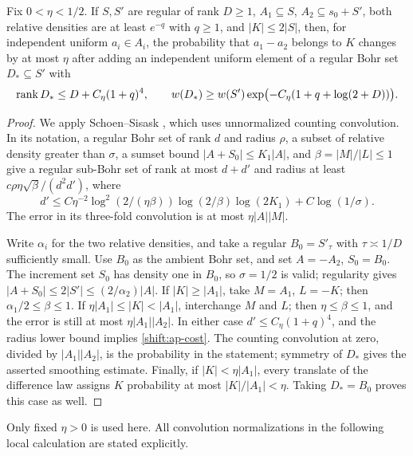 \begin{lemma}\label{shift:ap-width}
Fix $0<\eta<1/2$.  If $S,S'$ are regular of rank $D\geq1$,
$A_1\subseteq S$, $A_2\subseteq s_0+S'$, both relative densities are
at least $e^{-q}$ with $q\geq1$, and $|K|\leq2|S|$, then, for independent
uniform $a_i\in A_i$, the probability that $a_1-a_2$ belongs to $K$
changes by at most $\eta$ after adding an independent uniform element
of a regular Bohr set $D_*\subseteq S'$ with
\begin{equation}\label{shift:ap-cost}
 \operatorname{rank} D_*\leq D+C_\eta(1+q)^4,\qquad
 w(D_*)\geq w(S')\exp\bigl(-C_\eta(1+q+\log(2+D))\bigr).
\end{equation}
\end{lemma}
\begin{proof}
We apply Schoen--Sisask \cite[Theorem~5.4]{SchoenSisask2016}, which
uses unnormalized counting convolution.  In its notation, a regular
Bohr set of rank $d$ and radius $\rho$, a subset of relative density
greater than $\sigma$, a sumset bound $|A+S_0|\leq K_1|A|$, and
$\beta=|M|/|L|\leq1$ give a regular sub-Bohr set of rank at most
$d+d'$ and radius at least $c\rho\eta\sqrt\beta/(d^2d')$, where
\[
 d'\leq C\eta^{-2}\log^2(2/(\eta\beta))
       \log(2/\beta)\log(2K_1)+C\log(1/\sigma).
\]
The error in its three-fold convolution is at most $\eta|A||M|$.

Write $\alpha_i$ for the two relative densities, and take a regular
$B_0=S'_\tau$ with $\tau\asymp1/D$ sufficiently small.  Use $B_0$
as the ambient Bohr set, and set $A=-A_2$, $S_0=B_0$.
The increment set $S_0$ has density one in $B_0$, so
$\sigma=1/2$ is valid; regularity gives
$|A+S_0|\leq2|S'|\leq(2/\alpha_2)|A|$.
If $|K|\geq|A_1|$, take $M=A_1$, $L=-K$; then
$\alpha_1/2\leq\beta\leq1$.
If $\eta|A_1|\leq|K|<|A_1|$, interchange $M$ and $L$;
then $\eta\leq\beta\leq1$, and the error is still at most
$\eta|A_1||A_2|$.
In either case $d'\leq C_\eta(1+q)^4$, and the radius lower bound
implies \eqref{shift:ap-cost}.  The counting convolution at zero,
divided by $|A_1||A_2|$, is the probability in the statement;
symmetry of $D_*$ gives the asserted smoothing estimate.
Finally, if $|K|<\eta|A_1|$, every translate of the difference law
assigns $K$ probability at most $|K|/|A_1|<\eta$.
Taking $D_*=B_0$ proves this case as well.
\end{proof}

Only fixed $\eta>0$ is used here.  All convolution normalizations in
the following local calculation are stated explicitly.

